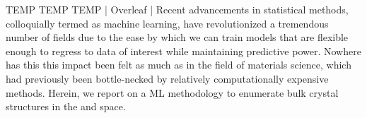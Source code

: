 

TEMP TEMP TEMP | Overleaf | Recent advancements in statistical methods, colloquially termed as machine learning,
have revolutionized a tremendous number of fields due to the ease by which we can train models that are flexible enough to regress to data of interest while maintaining predictive power.
Nowhere has this this impact been felt as much as in the field of materials science,
which had previously been bottle-necked by relatively computationally expensive methods.
Herein, we report on a ML methodology to enumerate bulk crystal structures in the  and  space.
